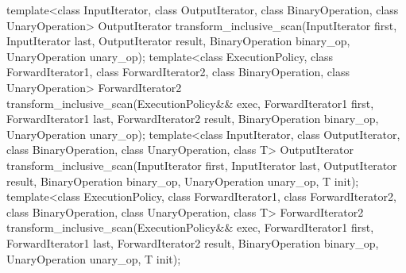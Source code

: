 %
\begin{itemdecl}
template<class InputIterator, class OutputIterator,
         class BinaryOperation, class UnaryOperation>
  OutputIterator transform_inclusive_scan(InputIterator first, InputIterator last,
                                          OutputIterator result,
                                          BinaryOperation binary_op, UnaryOperation unary_op);
template<class ExecutionPolicy,
         class ForwardIterator1, class ForwardIterator2,
         class BinaryOperation, class UnaryOperation>
  ForwardIterator2 transform_inclusive_scan(ExecutionPolicy&& exec,
                                            ForwardIterator1 first, ForwardIterator1 last,
                                            ForwardIterator2 result,
                                            BinaryOperation binary_op, UnaryOperation unary_op);
template<class InputIterator, class OutputIterator,
         class BinaryOperation, class UnaryOperation, class T>
  OutputIterator transform_inclusive_scan(InputIterator first, InputIterator last,
                                          OutputIterator result,
                                          BinaryOperation binary_op, UnaryOperation unary_op,
                                          T init);
template<class ExecutionPolicy,
         class ForwardIterator1, class ForwardIterator2,
         class BinaryOperation, class UnaryOperation, class T>
  ForwardIterator2 transform_inclusive_scan(ExecutionPolicy&& exec,
                                            ForwardIterator1 first, ForwardIterator1 last,
                                            ForwardIterator2 result,
                                            BinaryOperation binary_op, UnaryOperation unary_op,
                                            T init);
\end{itemdecl}

